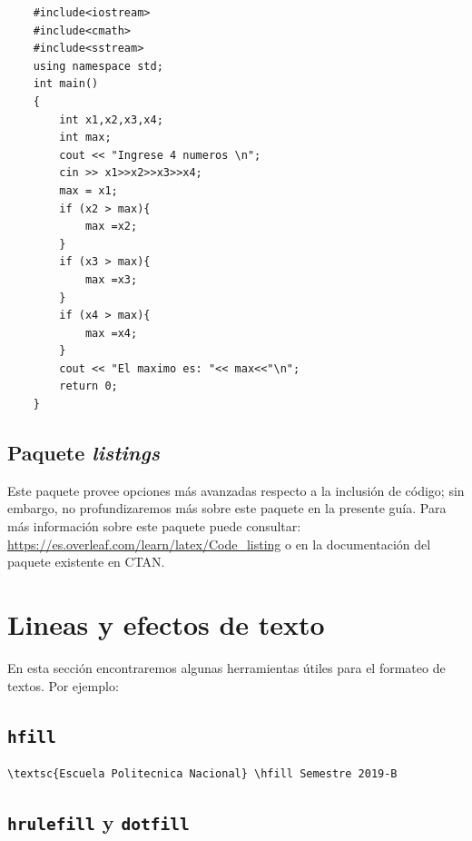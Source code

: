 \documentclass[a4,10pt]{aleph-notas}
\begin{document}
\noindent
\begin{verbatim}
    #include<iostream>
    #include<cmath>
    #include<sstream>
    using namespace std;
    int main()
    {       
        int x1,x2,x3,x4;
        int max;
        cout << "Ingrese 4 numeros \n";
        cin >> x1>>x2>>x3>>x4;
        max = x1;
        if (x2 > max){
            max =x2;
        }
        if (x3 > max){
            max =x3;
        }
        if (x4 > max){
            max =x4;
        }
        cout << "El maximo es: "<< max<<"\n";
        return 0;
    }
\end{verbatim}


\subsection{Paquete \emph{listings}}

Este paquete provee opciones más avanzadas respecto a la inclusión de código; sin embargo, no profundizaremos más sobre este paquete en la presente guía. Para más información sobre este paquete puede consultar: \href{https://es.overleaf.com/learn/latex/Code_listing}{https://es.overleaf.com/learn/latex/Code\_listing} o en la documentación del paquete existente en CTAN.

\section{Lineas y efectos de texto}

En esta sección encontraremos algunas herramientas útiles para el formateo de textos. Por ejemplo:

\subsection{\texttt{hfill}}

\begin{lstlisting}[frame=single]
\textsc{Escuela Politecnica Nacional} \hfill Semestre 2019-B
\end{lstlisting}

\begin{center}
{ \fboxsep 12pt
 }
\end{center}

\subsection{\texttt{hrulefill} y \texttt{dotfill}}
\end{document}
